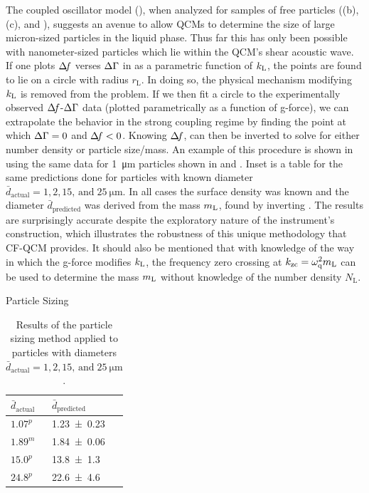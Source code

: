 The coupled oscillator model (), when analyzed for
samples of free particles ((b),
(c), and ), suggests an avenue
to allow QCMs to determine the size of large micron-sized particles in the
liquid phase.  Thus far this has only been possible with nanometer-sized
particles which lie within the QCM's shear acoustic
wave.~\cite{olsson2013using}  If one plots $\Delta\!f$ verses $\Delta\Gamma$ in
 as a parametric function of $k_\mathrm{L}$, the points are
found to lie on a circle with radius $r_\mathrm{L}$.  In doing so, the physical
mechanism modifying $k_\mathrm{L}$ is removed from the problem.
If we then fit a
circle to the experimentally observed $\Delta\!f$-$\Delta\Gamma$ data (plotted
parametrically as a function of g-force), we can extrapolate the behavior
in the strong coupling regime by finding the point at which $\Delta\Gamma=0$ and
$\Delta\!f<0$.  Knowing $\Delta\!f$,  can then be inverted to
solve for either number density or particle size/mass.  An example of this
procedure is shown in  using the same data for
\SI{1}{\micro\meter} particles shown in
 and .  Inset is a table for the same
predictions done for particles with known diameter
$\bar{d}_\mathrm{actual}=1, 2, 15,\,\mathrm{and}\;\SI{25}{\micro\meter}$.
In all cases the surface density was known and the diameter
$\bar{d}_\text{predicted}$ was derived from the mass $m_\mathrm{L}$, found by
inverting .  The results are surprisingly accurate
despite the exploratory nature of the instrument's construction, which
illustrates the robustness of this unique methodology that CF-QCM
provides.
It should also be mentioned that with knowledge of the way in which the
g-force modifies $k_\mathrm{L}$, the frequency zero crossing at
$k_\mathrm{zc}=\omega_\mathrm{q}^2m_\mathrm{L}$ can be used to determine the mass $m_\mathrm{L}$
without knowledge of the number density $N_\mathrm{L}$. 
\begin{table}[ht]
\centering
Particle Sizing\\
 \begin{tabularx}{80pt}{XX}
 \toprule
 $\bar{d}_\mathrm{actual}$ & $\bar{d}_\mathrm{predicted}$ \\
 \midrule
  $1.07^p$ & \num{1.23+-0.23} \\
  $1.89^m$ & \num{1.84+-0.06} \\
  $15.0^p$ & \num{13.8+-1.3} \\
  $24.8^p$ & \num{22.6+-4.6} \\
 \bottomrule
\end{tabularx}
\caption{Results of the particle sizing method applied to particles with diameters
$\bar{d}_\mathrm{actual}=1, 2, 15,\,\mathrm{and}\;\SI{25}{\micro\meter}$.}
\label{tbl:particlesizing}
\end{table}
